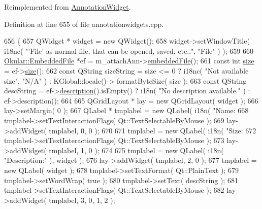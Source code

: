 Reimplemented from \hyperlink{classAnnotationWidget_ab46dbe69c6723a640048a75f6bf47423}{Annotation\+Widget}.



Definition at line 655 of file annotationwidgets.\+cpp.


\begin{DoxyCode}
656 \{
657     QWidget * widget = \textcolor{keyword}{new} QWidget();
658     widget->setWindowTitle( i18nc( \textcolor{stringliteral}{"'File' as normal file, that can be opened, saved, etc.."}, \textcolor{stringliteral}{"File"} ) );
659 
660     \hyperlink{classOkular_1_1EmbeddedFile}{Okular::EmbeddedFile} *ef = m\_attachAnn->\hyperlink{classOkular_1_1FileAttachmentAnnotation_a22ff85c689647a6daa6bac053fe60cbb}{embeddedFile}();
661     \textcolor{keyword}{const} \textcolor{keywordtype}{int} \hyperlink{synctex__parser_8c_aa23c661441688350614bd6a350d2b6ff}{size} = ef->\hyperlink{classOkular_1_1EmbeddedFile_a16654b3db51a4c46276516f7987c975d}{size}();
662     \textcolor{keyword}{const} QString sizeString = size <= 0 ? i18nc( \textcolor{stringliteral}{"Not available size"}, \textcolor{stringliteral}{"N/A"} ) : KGlobal::locale()->
      formatByteSize( size );
663     \textcolor{keyword}{const} QString descString = ef->\hyperlink{classOkular_1_1EmbeddedFile_a91a6efdeb1423a4030ce438b2a58c9a0}{description}().isEmpty() ? i18n( \textcolor{stringliteral}{"No description available."} )
       : ef->description();
664 
665     QGridLayout * lay = \textcolor{keyword}{new} QGridLayout( widget );
666     lay->setMargin( 0 );
667     QLabel * tmplabel = \textcolor{keyword}{new} QLabel( i18n( \textcolor{stringliteral}{"Name: %
668     tmplabel->setTextInteractionFlags( Qt::TextSelectableByMouse );
669     lay->addWidget( tmplabel, 0, 0 );
670 
671     tmplabel = \textcolor{keyword}{new} QLabel( i18n( \textcolor{stringliteral}{"Size: %
672     tmplabel->setTextInteractionFlags( Qt::TextSelectableByMouse );
673     lay->addWidget( tmplabel, 1, 0 );
674 
675     tmplabel = \textcolor{keyword}{new} QLabel( i18n( \textcolor{stringliteral}{"Description:"} ), widget );
676     lay->addWidget( tmplabel, 2, 0 );
677     tmplabel = \textcolor{keyword}{new} QLabel( widget );
678     tmplabel->setTextFormat( Qt::PlainText );
679     tmplabel->setWordWrap( \textcolor{keyword}{true} );
680     tmplabel->setText( descString );
681     tmplabel->setTextInteractionFlags( Qt::TextSelectableByMouse );
682     lay->addWidget( tmplabel, 3, 0, 1, 2 );
}}
\end{DoxyCode}
